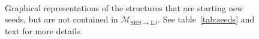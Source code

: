 \begin{figure}
    \centering
    \\
    \caption{Graphical representations of the structures that are starting new
    seeds, but are not contained in $\mathcal{M}_\mathrm{SHS\to LJ}$. See
    table~\ref{tab:seeds} and text for more details.}
    \label{fig:seeds}
\end{figure}%

